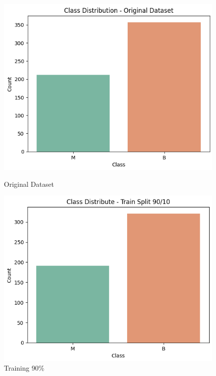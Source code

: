 \begin{figure}[h!]
	\centering
	\begin{minipage}[b]{0.32\linewidth}
		\centering
		\includegraphics[width=\linewidth]{figures/dataset1/4.png}
		\caption{Original Dataset}
		\label{fig:original_3}
	\end{minipage}%
	\hfill
	\begin{minipage}[b]{0.32\linewidth}
		\centering
		\includegraphics[width=\linewidth]{figures/dataset1/4.2.png}
		\caption{Training 90\%}
		\label{fig:train90}
	\end{minipage}%
	\hfill
	\begin{minipage}[b]{0.32\linewidth}

\end{minipage}
\end{figure}
